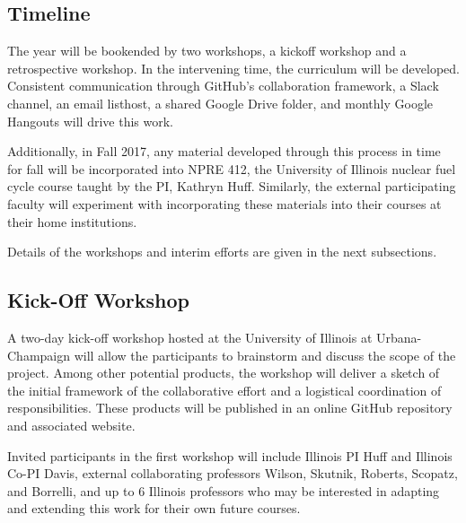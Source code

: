 \documentclass[11pt]{article}
\begin{document}
          \subsection{Timeline}
          The year will be bookended by two workshops, a kickoff workshop 
          and a retrospective workshop. In the intervening time, the curriculum 
          will be developed. Consistent 
          communication through GitHub's collaboration framework, a Slack 
          channel, an email listhost, a shared Google Drive folder, and monthly 
          Google Hangouts will drive this work.

          Additionally, in Fall 2017, any material developed through this 
          process in time for fall will be incorporated into NPRE 412, the 
          University of Illinois nuclear fuel cycle course taught by the PI, 
          Kathryn Huff. Similarly, the external participating faculty will 
          experiment with incorporating these materials into their courses at 
          their home institutions. 

          Details of the workshops and interim efforts are given in the next 
          subsections.

          \subsection{Kick-Off Workshop}
          A two-day kick-off workshop hosted at the University of Illinois at 
          Urbana-Champaign will allow the 
          participants to brainstorm and discuss the scope of the project.
          Among other potential products, the workshop will deliver
          a sketch of the initial framework of the collaborative effort and
          a logistical coordination of responsibilities. These products will
          be published in an online GitHub repository 
          and associated website.

          Invited participants in the first workshop will include Illinois PI Huff 
          and Illinois Co-PI Davis, external collaborating professors Wilson, 
          Skutnik, Roberts, Scopatz, and Borrelli, and up to 6 Illinois professors 
          who may be interested in adapting and extending this work for their own 
          future courses.
\end{document}
